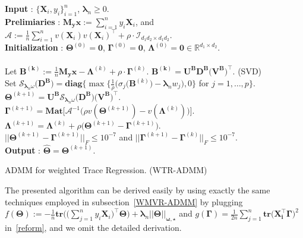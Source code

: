 \documentclass[alpha-refs]{wiley-article}
\begin{document}
\begin{algorithm}[hbt!] 
    \textbf{Input} : $\big\{\boldsymbol{X}_{i},y_{i}\big\}_{i=1}^{n}$, $\boldsymbol{\lambda}_{n} \geq 0$. \\
    \textbf{Prelimiaries} : $\boldsymbol{M_{y}x}:=\sum_{i=1}^{n}y_{i}\boldsymbol{X}_{i}$, and
    $\mathcal{A} := \frac{1}{n}\sum_{i=1}^{n} v(\boldsymbol{X}_{i})v(\boldsymbol{X}_{i})^{\top}+\rho\cdot\mathcal{I}_{ d_1d_2 \times d_1d_2}$. \\
    \textbf{Initialization} : $\boldsymbol{\Theta}^{(0)}=\boldsymbol{0}$, $\boldsymbol{\Gamma}^{(0)}=\boldsymbol{0}$, $\boldsymbol{\Lambda}^{(0)}=\boldsymbol{0} \in\mathbb{R}^{d_{1}\times d_{2}}$. \\
     \\
    \qquad {} Let $\boldsymbol{B^{(k)}}:=\frac{1}{n}\boldsymbol{M_{y}x}-\boldsymbol{\Lambda}^{(k)}+\rho \cdot \boldsymbol{\Gamma}^{(k)}$. \quad $\boldsymbol{B^{(k)}}=\boldsymbol{U}^{\textbf{B}}\boldsymbol{D}^{\textbf{B}}\big(\boldsymbol{V^{\textbf{B}}}\big)^{\top}$. (SVD) \\
    \qquad \qquad \qquad \qquad  Set $\mathcal{S}_{\boldsymbol{\lambda}_{n}\omega}\big(\boldsymbol{D}^{\textbf{B}}\big) = \textbf{diag}\bigg\{ \max\bigg\{\frac{1}{\rho}\big(\sigma_{j}(\boldsymbol{B}^{(k)}\big)-\boldsymbol{\lambda}_{n} w_{j}\big),0 \bigg\}$ for $j=1,\dots,p \bigg\}$.  \\
    \qquad \qquad \qquad \qquad $\boldsymbol{\Theta}^{(k+1)} = \boldsymbol{U}^{\textbf{B}} \mathcal{S}_{\boldsymbol{\lambda}_{n}\omega}\big(\boldsymbol{D}^{\textbf{B}}\big) \big(\boldsymbol{V^{\textbf{B}}}\big)^{\top}$.  \\
    \qquad {} 
    $\boldsymbol{\Gamma}^{(k+1)} = \textbf{Mat} \big[\mathcal{A}^{-1}\big(\rho v(\boldsymbol{\Theta}^{(k+1)})-v(\boldsymbol{\Lambda}^{(k)})\big)\big].$\\
    \qquad {} $\boldsymbol{\Lambda}^{(k+1)} = \boldsymbol{\Lambda}^{(k)} + \rho\big( \boldsymbol{\Theta}^{(k+1)}-\boldsymbol{\Gamma}^{(k+1)} \big)$.\\
     $|| \boldsymbol{\Theta}^{(k+1)}-\boldsymbol{\Gamma}^{(k+1)} ||_{F}\leq 10^{-7}$ and $|| \boldsymbol{\Gamma}^{(k+1)}-\boldsymbol{\Gamma}^{(k)} ||_{F}\leq 10^{-7}$. \\
    \textbf{Output} : $\widehat{\boldsymbol{\Theta}}=\boldsymbol{\Theta}^{(k+1)}$. 
    \caption{ADMM for weighted Trace Regression. (WTR-ADMM)}
    \label{trace_algo}
\end{algorithm}
The presented algorithm can be derived easily by using exactly the same techniques employed in subsection~\ref{WMVR-ADMM} by plugging $f(\boldsymbol{\Theta}):=-\frac{1}{n}\textbf{tr}\big( \big(\sum_{j=1}^{n}y_{i}\boldsymbol{X}_{i}\big)^{\top}\boldsymbol{\Theta} \big)+\boldsymbol{\lambda}_{n}||\boldsymbol{\Theta}||_{\boldsymbol{\omega,\star}}$ and $g(\boldsymbol{\Gamma})=\frac{1}{2n}\sum_{j=1}^{n}\textbf{tr}\big(\boldsymbol{X_i^\top}\boldsymbol{\Gamma}\big)^{2}$ in~\eqref{reform},
and we omit the detailed derivation.
\end{document}
